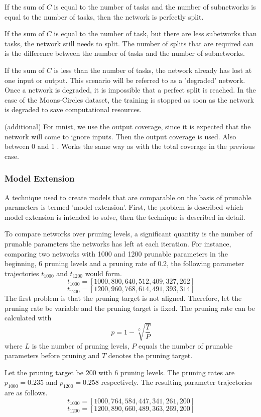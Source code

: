 If the sum of $C$ is equal to the number of tasks and the number of subnetworks is equal to the number of tasks, then the network is perfectly split.

If the sum of $C$ is equal to the number of task, but there are less subetworks than tasks, the network still needs to split.
The number of splits that are required can is the difference between the number of tasks and the number of subnetworks.

If the sum of $C$ is less than the number of tasks, the network already has lost at one input or output.
This scenario will be referred to as a 'degraded' network.
Once a network is degraded, it is impossible that a perfect split is reached.
In the case of the Moons-Circles dataset, the training is stopped as soon as the network is degraded to save computational resources.

(additional)
For mnist, we use the output coverage, since it is expected that the network will come to ignore inputs.
Then the output coverage is used. Also between 0 and 1 . Works the same way as with the total coverage in the previous case.

\subsubsection{Model Extension}
A technique used to create models that are comparable on the basis of prunable parameters is termed 'model extension'. First, the problem is described which model extension is intended to solve, then the technique is described in detail.

To compare networks over pruning levels, a significant quantity is the number of prunable parameters the networks has left at each iteration.
For instance, comparing two networks with 1000 and 1200 prunable parameters in the beginning, 6 pruning levels and a pruning rate of $0.2$, the following parameter trajectories $t_{1000}$ and $t_{1200}$ would form.
$$
t_{1000} = [1000, 800, 640, 512, 409, 327, 262]
$$
$$
t_{1200} = [1200, 960, 768, 614, 491, 393, 314]
$$
The first problem is that the pruning target is not aligned.
Therefore, let the pruning rate be variable and the pruning target is fixed.
The pruning rate can be calculated with 
$$
p = 1 - \sqrt[L]{\frac{T}{P}}
$$
where $L$ is the number of pruning levels, $P$ equals the number of prunable parameters before pruning and $T$ denotes the pruning target.

Let the pruning target be $200$ with 6 pruning levels.
The pruning rates are $p_{1000} = 0.235$ and $p_{1200} = 0.258$ respectively.
The resulting parameter trajectories are as follows.
$$
t_{1000} = [1000, 764, 584, 447, 341, 261, 200]
$$
$$
t_{1200} = [1200, 890, 660, 489, 363, 269, 200]
$$

